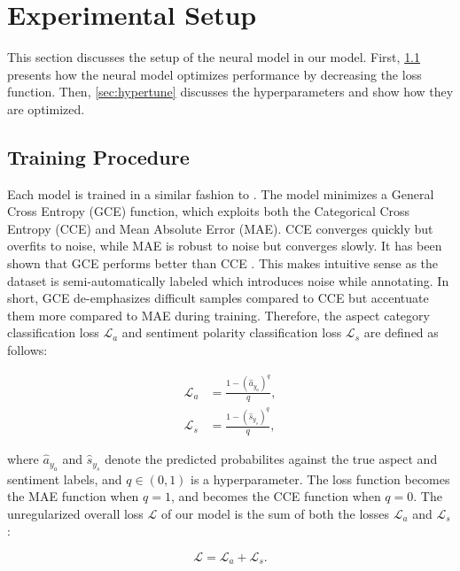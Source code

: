 \documentclass[american, oneside]{ecsgdp}
\begin{document}
\section{Experimental Setup} \label{sec:setup}
This section discusses the setup of the neural model in our model. First, \cref{sec:training} presents how the neural model optimizes performance by decreasing the loss function. Then, \cref{sec:hypertune} discusses the hyperparameters and show how they are optimized.

\subsection{Training Procedure} \label{sec:training}
Each model is trained in a similar fashion to \textcite{Kumar2021CASC}. The model minimizes a General Cross Entropy (GCE) function, which exploits both the Categorical Cross Entropy (CCE) and Mean Absolute Error (MAE). %
CCE converges quickly but overfits to noise, while MAE is robust to noise but converges slowly. It has been shown that GCE performs better than CCE \parencite{Kumar2021CASC}. This makes intuitive sense as the dataset is semi-automatically labeled which introduces noise while annotating. In short, GCE de-emphasizes difficult samples compared to CCE but accentuate them more compared to MAE during training. Therefore, the aspect category classification loss $\mathcal{L}_a$ and sentiment polarity classification loss $\mathcal{L}_s$ are defined as follows:

\begin{align}
  \mathcal{L}_a & = \frac{1 - \left( \hat{a}_{y_a} \right)^q} {q}, \\
  \mathcal{L}_s & = \frac{1 - \left( \hat{s}_{y_s} \right)^q} {q},
\end{align}

\noindent where $\hat{a}_{y_a}$ and $\hat{s}_{y_s}$ denote the predicted probabilites against the true aspect and sentiment labels, and $q \in (0, 1)$ is a hyperparameter. The loss function becomes the MAE function when $q=1$, and becomes the CCE function when $q=0$. The unregularized overall loss $\mathcal{L}$ of our model is the sum of both the losses $\mathcal{L}_a$ and $\mathcal{L}_s$:

\begin{equation}
    \mathcal{L} = \mathcal{L}_a + \mathcal{L}_s.
\end{equation}
\end{document}
